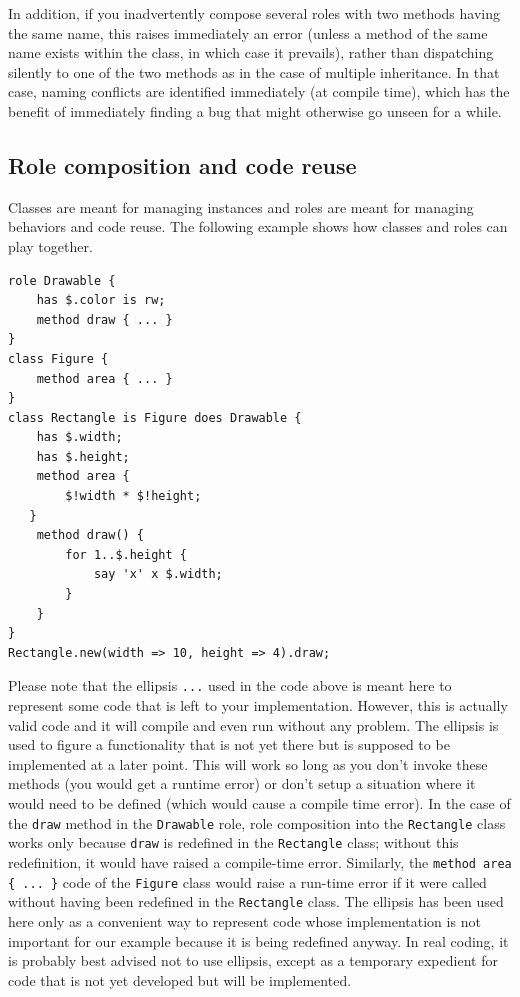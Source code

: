 
In addition, if you inadvertently compose several roles with 
two methods having the same name, this raises immediately 
an error (unless a method of the same name exists within the 
class, in which case it prevails), rather than dispatching 
silently to one of the two methods as in the case of multiple 
inheritance. In that case, naming conflicts are identified 
immediately (at compile time), which has the benefit of 
immediately finding a bug that might otherwise go 
unseen for a while.

\subsection{Role composition and code reuse}

Classes are meant for managing instances and roles are 
meant for managing behaviors and code reuse. The following 
example shows how classes and roles can play together.

\begin{verbatim}
role Drawable {
    has $.color is rw;
    method draw { ... }
}
class Figure {
    method area { ... }
}
class Rectangle is Figure does Drawable {
    has $.width;
    has $.height;
    method area {
        $!width * $!height;
   }
    method draw() {
        for 1..$.height {
            say 'x' x $.width;
        }
    }
}
Rectangle.new(width => 10, height => 4).draw;
\end{verbatim}

Please note that the ellipsis \verb'...' used in the code 
above is meant here to represent some code that is left 
to your implementation. However, this is actually valid code 
and it will compile and even run without any problem. The 
ellipsis is used to figure a functionality that is not yet 
there but is supposed to be implemented at a later point. This 
will work so long as you don't invoke these methods (you would 
get a runtime error) or don't setup a situation where it would 
need to be defined (which would cause a compile time error). 
In the case of the {\tt draw} method in the 
{\tt Drawable} role, role composition into the {\tt Rectangle} 
class works only because {\tt draw} is redefined in the 
{\tt Rectangle} class; without this redefinition, it would 
have raised a compile-time error. Similarly, 
the \verb'method area { ... }' 
code of the {\tt Figure} class would raise a run-time error if it 
were called without having been redefined in the {\tt Rectangle} 
class. The ellipsis has been used here only as a convenient way 
to represent code whose implementation is not important for 
our example because it is being redefined anyway. In real coding, 
it is probably best advised not to use ellipsis, except as a 
temporary expedient for code that is not yet developed but
will be implemented.

